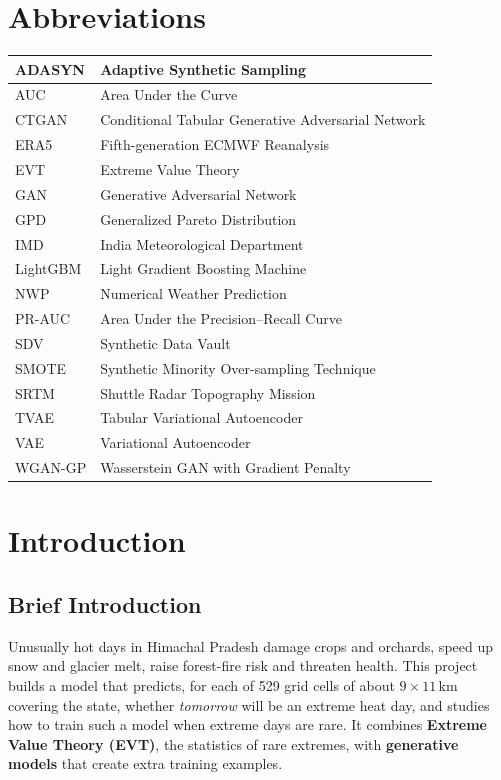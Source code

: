 \documentclass[12pt,a4paper]{report}
\begin{document}
\chapter*{Abbreviations}
\begin{center}
\begin{tabularx}{\textwidth}{|p{3.2cm}|X|}
\hline
ADASYN & Adaptive Synthetic Sampling \\ \hline
AUC & Area Under the Curve \\ \hline
CTGAN & Conditional Tabular Generative Adversarial Network \\ \hline
ERA5 & Fifth-generation ECMWF Reanalysis \\ \hline
EVT & Extreme Value Theory \\ \hline
GAN & Generative Adversarial Network \\ \hline
GPD & Generalized Pareto Distribution \\ \hline
IMD & India Meteorological Department \\ \hline
LightGBM & Light Gradient Boosting Machine \\ \hline
NWP & Numerical Weather Prediction \\ \hline
PR-AUC & Area Under the Precision--Recall Curve \\ \hline
SDV & Synthetic Data Vault \\ \hline
SMOTE & Synthetic Minority Over-sampling Technique \\ \hline
SRTM & Shuttle Radar Topography Mission \\ \hline
TVAE & Tabular Variational Autoencoder \\ \hline
VAE & Variational Autoencoder \\ \hline
WGAN-GP & Wasserstein GAN with Gradient Penalty \\ \hline
\end{tabularx}
\end{center}

\chapter{Introduction}
\section{Brief Introduction}
Unusually hot days in Himachal Pradesh damage crops and orchards, speed up snow and glacier melt, raise forest-fire
risk and threaten health. This project builds a model that predicts, for each of 529 grid cells of about
$9\times11$\,km covering the state, whether \emph{tomorrow} will be an extreme heat day, and studies how to train such a model when extreme days are rare. It
combines \textbf{Extreme Value Theory (EVT)}, the statistics of rare extremes, with \textbf{generative models} that
create extra training examples.
\end{document}
